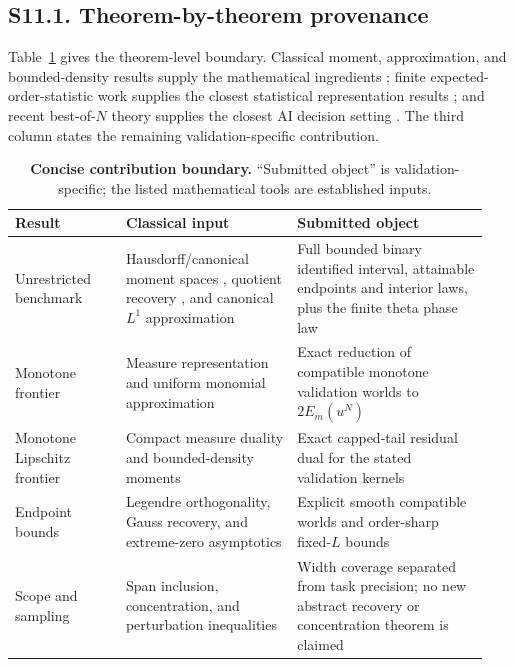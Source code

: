 \documentclass[10pt,twocolumn]{article}
\begin{document}
\subsection*{S11.1. Theorem-by-theorem provenance}

Table~\ref{si:tab:provenance} gives the theorem-level boundary. Classical moment, approximation, and bounded-density results supply the mathematical ingredients \citep{hausdorff1921,dette1997,bojanov1986,newman1976,lasserre2006}; finite expected-order-statistic work supplies the closest statistical representation results \citep{mallows1973,papadatos2017,okolewski2024}; and recent best-of-$N$ theory supplies the closest AI decision setting \citep{huang2025}. The third column states the remaining validation-specific contribution.

\begin{table}[H]
\centering
\caption{\textbf{Concise contribution boundary.} ``Submitted object'' is validation-specific; the listed mathematical tools are established inputs.}
\label{si:tab:provenance}
\begingroup
\footnotesize
\setlength{\tabcolsep}{3pt}
\begin{tabular}{@{}>{\raggedright\arraybackslash}p{0.22\linewidth}>{\raggedright\arraybackslash}p{0.34\linewidth}>{\raggedright\arraybackslash}p{0.38\linewidth}@{}}
\toprule
Result & Classical input & Submitted object \\
\midrule
Unrestricted benchmark & Hausdorff/canonical moment spaces \citep{hausdorff1921,dette1997}, quotient recovery \citep{donoho1994}, and canonical $L^1$ approximation \citep{bojanov1986} & Full bounded binary identified interval, attainable endpoints and interior laws, plus the finite theta phase law \\
Monotone frontier & Measure representation and uniform monomial approximation \citep{newman1976} & Exact reduction of compatible monotone validation worlds to $2E_m(u^N)$ \\
Monotone Lipschitz frontier & Compact measure duality and bounded-density moments \citep{lasserre2006} & Exact capped-tail residual dual for the stated validation kernels \\
Endpoint bounds & Legendre orthogonality, Gauss recovery, and extreme-zero asymptotics & Explicit smooth compatible worlds and order-sharp fixed-$L$ bounds \\
Scope and sampling & Span inclusion, concentration, and perturbation inequalities \citep{ettehad2021} & Width coverage separated from task precision; no new abstract recovery or concentration theorem is claimed \\
\bottomrule
\end{tabular}
\endgroup
\end{table}
\end{document}
